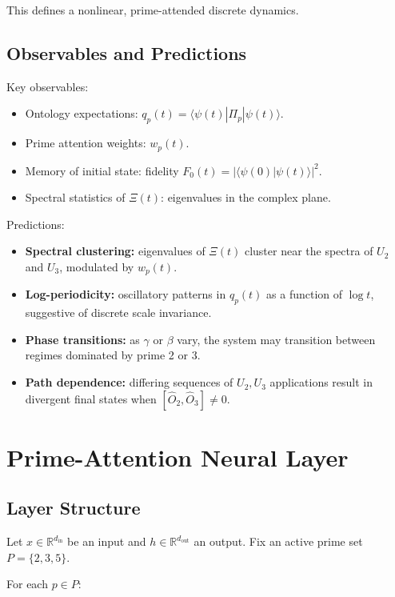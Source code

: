 \documentclass[11pt]{article}
\begin{document}
This defines a nonlinear, prime-attended discrete dynamics.

\subsection{Observables and Predictions}

Key observables:

\begin{itemize}[nosep]
  \item Ontology expectations: $q_p(t) = \langle \psi(t)|\Pi_p|\psi(t)\rangle$.
  \item Prime attention weights: $w_p(t)$.
  \item Memory of initial state: fidelity $F_0(t) = |\langle \psi(0)|\psi(t)\rangle|^2$.
  \item Spectral statistics of $\Xi(t)$: eigenvalues in the complex plane.
\end{itemize}

Predictions:

\begin{itemize}[nosep]
  \item \textbf{Spectral clustering:} eigenvalues of $\Xi(t)$ cluster near the spectra of $U_2$ and $U_3$, modulated by $w_p(t)$.
  \item \textbf{Log-periodicity:} oscillatory patterns in $q_p(t)$ as a function of $\log t$, suggestive of discrete scale invariance.
  \item \textbf{Phase transitions:} as $\gamma$ or $\beta$ vary, the system may transition between regimes dominated by prime 2 or 3.
  \item \textbf{Path dependence:} differing sequences of $U_2,U_3$ applications result in divergent final states when $[\hat{O}_2,\hat{O}_3]\neq 0$.
\end{itemize}

\section{Prime-Attention Neural Layer}

\subsection{Layer Structure}

Let $x \in \mathbb{R}^{d_{\mathrm{in}}}$ be an input and $h \in \mathbb{R}^{d_{\mathrm{out}}}$ an output. Fix an active prime set $P=\{2,3,5\}$.

For each $p\in P$:
\end{document}
